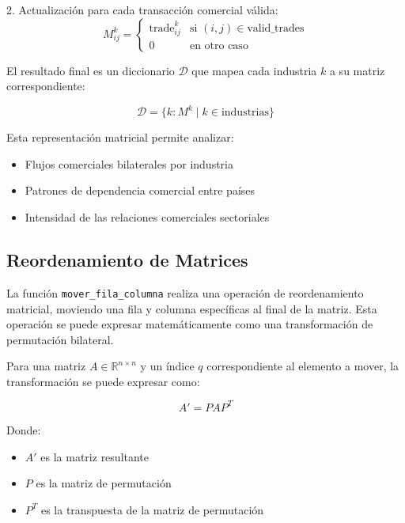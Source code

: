 \documentclass[11pt,a4paper]{article}
\begin{document}
2. Actualización para cada transacción comercial válida:
   \begin{equation}
   M^k_{ij} = \begin{cases}
   \text{trade}_{ij}^k & \text{si } (i,j) \in \text{valid\_trades} \\
   0 & \text{en otro caso}
   \end{cases}
   \end{equation}

El resultado final es un diccionario $\mathcal{D}$ que mapea cada industria $k$ a su matriz correspondiente:

\begin{equation}
\mathcal{D} = \{k: M^k \mid k \in \text{industrias}\}
\end{equation}

Esta representación matricial permite analizar:
\begin{itemize}
    \item Flujos comerciales bilaterales por industria
    \item Patrones de dependencia comercial entre países
    \item Intensidad de las relaciones comerciales sectoriales
\end{itemize}

\subsection{Reordenamiento de Matrices}

La función \texttt{mover\_fila\_columna} realiza una operación de reordenamiento matricial, moviendo una fila y columna específicas al final de la matriz. Esta operación se puede expresar matemáticamente como una transformación de permutación bilateral.

Para una matriz $A \in \mathbb{R}^{n \times n}$ y un índice $q$ correspondiente al elemento a mover, la transformación se puede expresar como:

\begin{equation}
A' = PAP^T
\end{equation}

Donde:
\begin{itemize}
    \item $A'$ es la matriz resultante
    \item $P$ es la matriz de permutación
    \item $P^T$ es la transpuesta de la matriz de permutación
\end{itemize}
\end{document}
